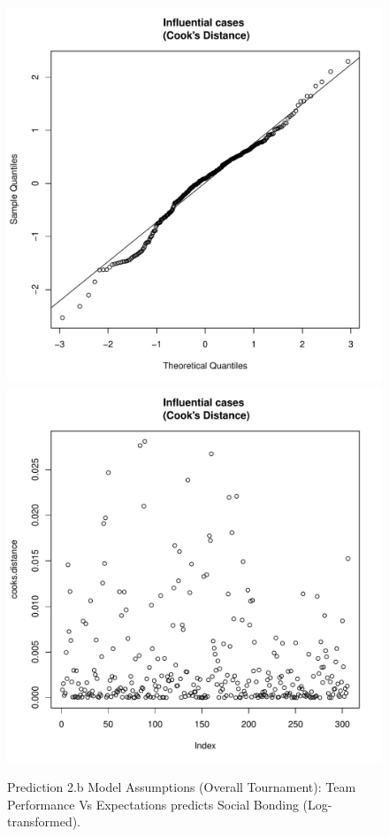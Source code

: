 \begin{CJK}{UTF8}{gbsn}
\begin{figure}[!htbp]
        \includegraphics[scale =.4]{images/MLM32aQQNorm.pdf}
        \includegraphics[scale =.4]{images/MLM32aCooksD.pdf}
        \caption{Prediction 2.b Model Assumptions (Overall Tournament): Team Performance Vs Expectations predicts Social Bonding (Log-transformed).}
     \label{fig:MLM32aLogAssumptions}
    \end{figure}


      \end{CJK}
